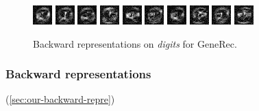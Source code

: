 \begin{figure}[H]
  \centering
  \includegraphics{../presentation/img/dig_0.png} %
  \includegraphics{../presentation/img/dig_1.png} 
  \includegraphics{../presentation/img/dig_2.png} 
  \includegraphics{../presentation/img/dig_3.png} 
  \includegraphics{../presentation/img/dig_4.png} 
  \includegraphics{../presentation/img/dig_5.png} 
  \includegraphics{../presentation/img/dig_6.png} 
  \includegraphics{../presentation/img/dig_7.png} 
  \includegraphics{../presentation/img/dig_8.png} 
  \includegraphics{../presentation/img/dig_9.png} 
  \caption{Backward representations on \emph{digits} for GeneRec.}
  \label{fig:results-backward-repre-generec}
\end{figure}


\subsubsection{Backward representations} 
(\ref{sec:our-backward-repre}) 

